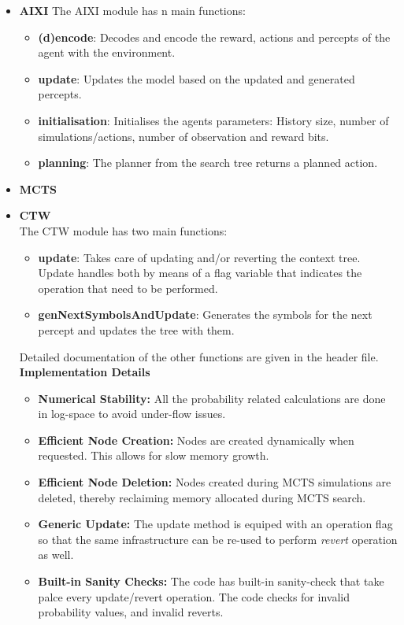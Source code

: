 \documentclass{article}
\theoremstyle{definition}
\newtheorem{primary statistics}[definition]{Primary Statistics}
\newtheorem{auxiliary statistics}[definition]{Auxiliary Statistics}
\begin{document}

\begin{itemize}
    \item \textbf{AIXI} The AIXI module has n main functions: 
    \begin{itemize}
        \item \textbf{(d)encode}: Decodes and encode the reward, actions and percepts of the agent with the environment.
        \item \textbf{update}: Updates the model based on the updated and generated percepts.
        \item \textbf{initialisation}: Initialises the agents parameters: History size, number of simulations/actions, number of observation and reward bits.
        \item \textbf{planning}: The planner from the search tree returns a planned action.
    \end{itemize}
    \item \textbf{MCTS} 
    \item \textbf{CTW}\\
    The CTW module has two main functions: 
    \begin{itemize}
        \item \textbf{update}: Takes care of updating and/or reverting the context tree. Update handles both by means of a flag variable that indicates the operation that need to be performed.
        \item \textbf{genNextSymbolsAndUpdate}: Generates the symbols for the next percept and updates the tree with them.
    \end{itemize}
    Detailed documentation of the other functions are given in the header file.\\

    \textbf{Implementation Details}
    \begin{itemize}
        \item \textbf{Numerical Stability:} All the probability related calculations are done in log-space to avoid under-flow issues.
        \item \textbf{Efficient Node Creation:} Nodes are created dynamically when requested. This allows for slow memory growth.
        \item \textbf{Efficient Node Deletion:} Nodes created during MCTS simulations are deleted, thereby reclaiming memory allocated during MCTS search.
        \item \textbf{Generic Update:} The update method is equiped with an operation flag so that the same infrastructure can be re-used to perform \textit{revert} operation as well.
        \item \textbf{Built-in Sanity Checks:} The code has built-in sanity-check that take palce every update/revert operation. The code checks for invalid probability values, and invalid reverts.
    \end{itemize}
\end{itemize}
\end{document}
